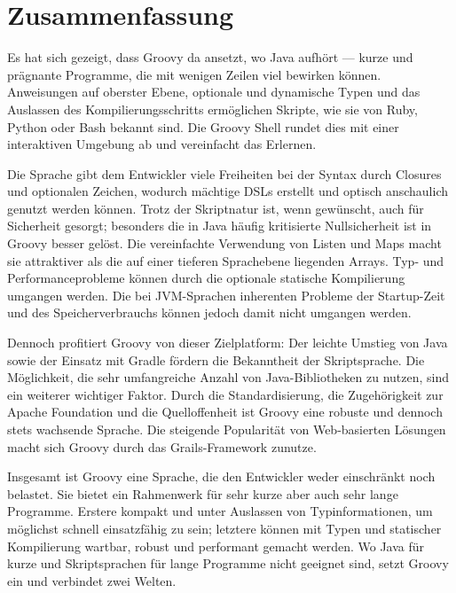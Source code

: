 \documentclass[a4paper]{article}
\begin{document}

\section{Zusammenfassung}\label{sec:zusammenfassung}

Es hat sich gezeigt, dass Groovy da ansetzt, wo Java aufhört --- kurze und prägnante Programme, die mit wenigen Zeilen viel bewirken können.
Anweisungen auf oberster Ebene, optionale und dynamische Typen und das Auslassen des Kompilierungsschritts ermöglichen Skripte, wie sie von Ruby, Python oder Bash bekannt sind.
Die Groovy Shell rundet dies mit einer interaktiven Umgebung ab und vereinfacht das Erlernen.

Die Sprache gibt dem Entwickler viele Freiheiten bei der Syntax durch Closures und optionalen Zeichen, wodurch mächtige DSLs erstellt und optisch anschaulich genutzt werden können.
Trotz der Skriptnatur ist, wenn gewünscht, auch für Sicherheit gesorgt;
besonders die in Java häufig kritisierte Nullsicherheit ist in Groovy besser gelöst.
Die vereinfachte Verwendung von Listen und Maps macht sie attraktiver als die auf einer tieferen Sprachebene liegenden Arrays.
Typ- und Performanceprobleme können durch die optionale statische Kompilierung umgangen werden.
Die bei JVM-Sprachen inherenten Probleme der Startup-Zeit und des Speicherverbrauchs können jedoch damit nicht umgangen werden.

Dennoch profitiert Groovy von dieser Zielplatform:
Der leichte Umstieg von Java sowie der Einsatz mit Gradle fördern die Bekanntheit der Skriptsprache.
Die Möglichkeit, die sehr umfangreiche Anzahl von Java-Bibliotheken zu nutzen, sind ein weiterer wichtiger Faktor.
Durch die Standardisierung, die Zugehörigkeit zur Apache Foundation und die Quelloffenheit ist Groovy eine robuste und dennoch stets wachsende Sprache.
Die steigende Popularität von Web-basierten Lösungen macht sich Groovy durch das Grails-Framework zunutze.

Insgesamt ist Groovy eine Sprache, die den Entwickler weder einschränkt noch belastet.
Sie bietet ein Rahmenwerk für sehr kurze aber auch sehr lange Programme.
Erstere kompakt und unter Auslassen von Typinformationen, um möglichst schnell einsatzfähig zu sein;
letztere können mit Typen und statischer Kompilierung wartbar, robust und performant gemacht werden.
Wo Java für kurze und Skriptsprachen für lange Programme nicht geeignet sind, setzt Groovy ein und verbindet zwei Welten.



\begingroup
	\linespread{0}\selectfont %
	
\endgroup

\end{document}
